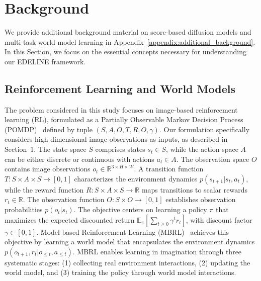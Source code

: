\section{Background}
\vspace{-0.5em}
We provide additional background material on score-based diffusion models and multi-task world model learning in Appendix~\ref{appendix:additional_background}. In this Section, we focus on the essential concepts necessary for understanding our EDELINE framework.
\vspace{-0.5em}

\subsection{Reinforcement Learning and World Models}
\vspace{-0.5em}
The problem considered in this study focuses on image-based reinforcement learning (RL), formulated as a Partially Observable Markov Decision Process (POMDP)~\cite{strm1965OptimalCO} defined by tuple $(S, A, O, T, R, O, \gamma)$. Our formulation specifically considers high-dimensional image observations as inputs, as described in Section~1. The state space $S$ comprises states $s_t \in S$, while the action space $A$ can be either discrete or continuous with actions $a_t \in A$. The observation space $O$ contains image observations $o_t \in \mathbb{R}^{3 \times H \times W}$. A transition function $T: S \times A \times S \rightarrow [0,1]$ characterizes the environment dynamics $p(s_{t+1}|s_t, a_t)$, while the reward function $R: S \times A \times S \rightarrow \mathbb{R}$ maps transitions to scalar rewards $r_t \in \mathbb{R}$. The observation function $O: S \times O \rightarrow [0,1]$ establishes observation probabilities $p(o_t|s_t)$.
%
The objective centers on learning a policy $\pi$ that maximizes the expected discounted return $\mathbb{E}_\pi[\sum_{t\geq0} \gamma^t r_t]$, with discount factor $\gamma \in [0,1]$. Model-based Reinforcement Learning (MBRL)~\cite{Sutton1988LearningTP} achieves this objective by learning a world model that encapsulates the environment dynamics $p(o_{t+1}, r_t|o_{\leq t}, a_{\leq t})$. MBRL enables learning in imagination through three systematic stages: (1) collecting real environment interactions, (2) updating the world model, and (3) training the policy through world model interactions.

